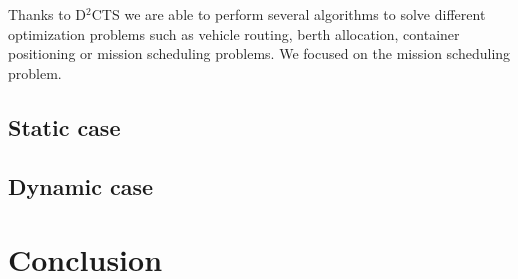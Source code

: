 \documentclass[a4paper,10pt]{article}
\begin{document}
Thanks to D$^2$CTS we are able to perform several algorithms to solve different optimization problems such as vehicle routing, berth allocation, container positioning or mission scheduling problems. We focused on the mission scheduling problem.

\subsection{Static case}
\subsection{Dynamic case}

\section{Conclusion}



\end{document}
